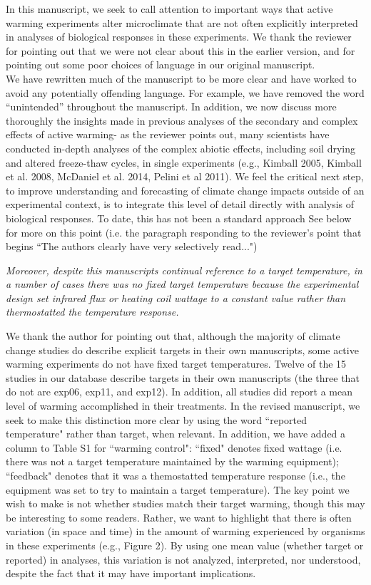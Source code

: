 \documentclass[11pt,a4paper]{letter}
\begin{document}
\begin{letter}{}
In this manuscript, we seek to call attention to important ways that active warming experiments alter microclimate that are not often explicitly interpreted in analyses of biological responses in these experiments. We thank the reviewer for pointing out that we were not clear about this in the earlier version, and for pointing out some poor choices of language in our original manuscript. \\

We have rewritten much of the manuscript to be more clear and have worked to avoid any potentially offending language. For example, we have removed the word ``unintended'' throughout the manuscript. In addition, we now discuss more thoroughly the insights made in previous analyses of the secondary and complex effects of active warming- as the reviewer points out, many scientists have conducted in-depth analyses of the complex abiotic effects, including soil drying and altered freeze-thaw cycles, in single experiments (e.g., Kimball 2005, Kimball et al. 2008, McDaniel et al. 2014, Pelini et al 2011). We feel the critical next step, to improve understanding and  forecasting of climate change impacts outside of an experimental context, is to integrate this level of detail directly with analysis of biological responses. To date, this has not been a standard approach See below for more on this point (i.e. the paragraph responding to the reviewer's point that begins ``The authors clearly have very selectively read...")

\par \emph{Moreover, despite this manuscripts continual reference to a target temperature, in a number of cases there  was no fixed target temperature because the experimental design set infrared flux or heating coil wattage to a constant value rather than thermostatted the temperature response.}
\par We thank the author for pointing out that, although the majority of climate change studies do describe explicit targets in their own manuscripts, some active warming experiments do not have fixed target temperatures. Twelve of the 15 studies in our database describe targets in their own manuscripts (the three that do not are exp06, exp11, and exp12). In addition, all studies did report a mean level of warming accomplished in their treatments. In the revised manuscript, we seek to make this distinction  more clear by  using the word ``reported temperature" rather than target, when relevant. In addition, we have added a column to Table S1 for ``warming control": ``fixed" denotes fixed wattage (i.e. there was not a target temperature maintained by the warming equipment); ``feedback" denotes that it was a themostatted temperature response (i.e., the equipment was set to try to maintain a target temperature). The key point we wish to make is not whether studies match their target warming, though this may be interesting to some readers. Rather, we want to highlight that there is often variation (in space and time) in the amount of warming experienced by organisms in these experiments (e.g., Figure 2). By using one mean value (whether target or reported) in analyses, this variation is not analyzed, interpreted, nor understood, despite the fact that it may have important implications.


\end{letter}
\end{document}
